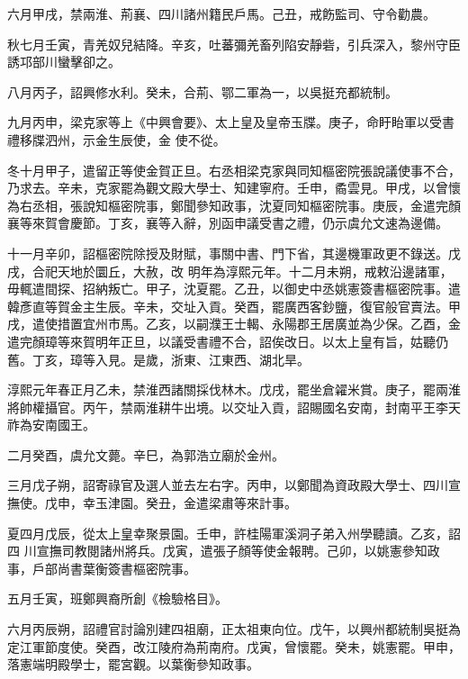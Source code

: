 \begin{pinyinscope}
 六月甲戌，禁兩淮、荊襄、四川諸州籍民戶馬。己丑，戒飭監司、守令勸農。



 秋七月壬寅，青羌奴兒結降。辛亥，吐蕃彌羌畜列陷安靜砦，引兵深入，黎州守臣誘邛部川蠻擊卻之。



 八月丙子，詔興修水利。癸未，合荊、鄂二軍為一，以吳挺充都統制。



 九月丙申，梁克家等上《中興會要》、太上皇及皇帝玉牒。庚子，命盱眙軍以受書禮移牒泗州，示金生辰使，金
 使不從。



 冬十月甲子，遣留正等使金賀正旦。右丞相梁克家與同知樞密院張說議使事不合，乃求去。辛未，克家罷為觀文殿大學士、知建寧府。壬申，矞雲見。甲戌，以曾懷為右丞相，張說知樞密院事，鄭聞參知政事，沈夏同知樞密院事。庚辰，金遣完顏襄等來賀會慶節。丁亥，襄等入辭，別函申議受書之禮，仍示虞允文速為邊備。



 十一月辛卯，詔樞密院除授及財賦，事關中書、門下省，其邊機軍政更不錄送。戊戌，合祀天地於圜丘，大赦，改
 明年為淳熙元年。十二月未朔，戒敕沿邊諸軍，毋輒遣間探、招納叛亡。甲子，沈夏罷。乙丑，以御史中丞姚憲簽書樞密院事。遣韓彥直等賀金主生辰。辛未，交址入貢。癸酉，罷廣西客鈔鹽，復官般官賣法。甲戌，遣使措置宜州市馬。乙亥，以嗣濮王士輵、永陽郡王居廣並為少保。乙酉，金遣完顏璋等來賀明年正旦，以議受書禮不合，詔俟改日。以太上皇有旨，姑聽仍舊。丁亥，璋等入見。是歲，浙東、江東西、湖北旱。



 淳熙元年春正月乙未，禁淮西諸關採伐林木。戊戌，罷坐倉糴米賞。庚子，罷兩淮將帥權攝官。丙午，禁兩淮耕牛出境。以交址入貢，詔賜國名安南，封南平王李天祚為安南國王。



 二月癸酉，虞允文薨。辛巳，為郭浩立廟於金州。



 三月戊子朔，詔寄祿官及選人並去左右字。丙申，以鄭聞為資政殿大學士、四川宣撫使。戊申，幸玉津園。癸丑，金遣梁肅等來計事。



 夏四月戊辰，從太上皇幸聚景園。壬申，許桂陽軍溪洞子弟入州學聽讀。乙亥，詔四
 川宣撫司教閱諸州將兵。戊寅，遣張子顏等使金報聘。己卯，以姚憲參知政事，戶部尚書葉衡簽書樞密院事。



 五月壬寅，班鄭興裔所創《檢驗格目》。



 六月丙辰朔，詔禮官討論別建四祖廟，正太祖東向位。戊午，以興州都統制吳挺為定江軍節度使。癸酉，改江陵府為荊南府。戊寅，曾懷罷。癸未，姚憲罷。甲申，落憲端明殿學士，罷宮觀。以葉衡參知政事。




\end{pinyinscope}
